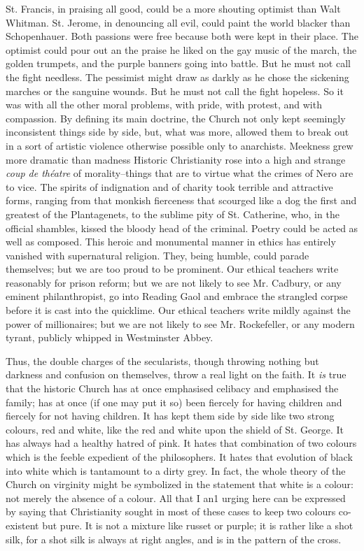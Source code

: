 \documentclass{book}
\begin{document}
St. Francis, in praising all good, could be a more shouting optimist than Walt Whitman. St. Jerome, in denouncing all evil, could paint the world blacker than Schopenhauer. Both passions were free because both were kept in their place. The optimist could pour out an the praise he liked on the gay music of the march, the golden trumpets, and the purple banners going into battle. But he must not call the fight needless. The pessimist might draw as darkly as he chose the sickening marches or the sanguine wounds. But he must not call the fight hopeless. So it was with all the other moral problems, with pride, with protest, and with compassion. By defining its main doctrine, the Church not only kept seemingly inconsistent things side by side, but, what was more, allowed them to break out in a sort of artistic violence otherwise possible only to anarchists. Meekness grew more dramatic than madness Historic Christianity rose into a high and strange \emph{coup de théatre} of morality–things that are to virtue what the crimes of Nero are to vice. The spirits of indignation and of charity took terrible and attractive forms, ranging from that monkish fierceness that scourged like a dog the first and greatest of the Plantagenets, to the sublime pity of St. Catherine, who, in the official shambles, kissed the bloody head of the criminal. Poetry could be acted as well as composed. This heroic and monumental manner in ethics has entirely vanished with supernatural religion. They, being humble, could parade themselves; but we are too proud to be prominent. Our ethical teachers write reasonably for prison reform; but we are not likely to see Mr. Cadbury, or any eminent philanthropist, go into Reading Gaol and embrace the strangled corpse before it is cast into the quicklime. Our ethical teachers write mildly against the power of millionaires; but we are not likely to see Mr. Rockefeller, or any modern tyrant, publicly whipped in Westminster Abbey.

Thus, the double charges of the secularists, though throwing nothing but darkness and confusion on themselves, throw a real light on the faith. It \emph{is} true that the historic Church has at once emphasised celibacy and emphasised the family; has at once (if one may put it so) been fiercely for having children and fiercely for not having children. It has kept them side by side like two strong colours, red and white, like the red and white upon the shield of St. George. It has always had a healthy hatred of pink. It hates that combination of two colours which is the feeble expedient of the philosophers. It hates that evolution of black into white which is tantamount to a dirty grey. In fact, the whole theory of the Church on virginity might be symbolized in the statement that white is a colour: not merely the absence of a colour. All that I an1 urging here can be expressed by saying that Christianity sought in most of these cases to keep two colours co-existent but pure. It is not a mixture like russet or purple; it is rather like a shot silk, for a shot silk is always at right angles, and is in the pattern of the cross.
\end{document}
